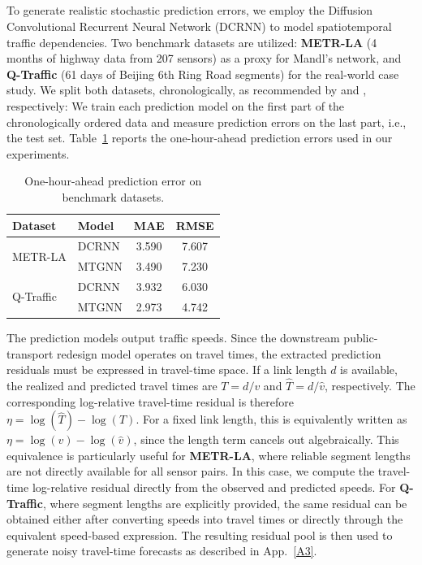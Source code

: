 \subsection{}\label{A2}

To generate realistic stochastic prediction errors, we employ the Diffusion Convolutional Recurrent Neural Network (DCRNN) \citep{li2017diffusion} to model spatiotemporal traffic dependencies. Two benchmark datasets are utilized: \textbf{METR-LA} (4 months of highway data from 207 sensors) as a proxy for Mandl’s network, and \textbf{Q-Traffic} (61 days of Beijing 6th Ring Road segments) for the real-world case study. We split both datasets, chronologically,  as recommended by \cite{li2017diffusion} and \cite{lu2022graph}, respectively: We train each prediction model on the first part of the chronologically ordered
data and measure prediction errors on the last part, i.e., the test set.
Table~\ref{tab:prediction_error} reports the one-hour-ahead prediction errors
used in our experiments.

\begin{table}[htbp!]
\centering
\caption{One-hour-ahead prediction error on benchmark datasets.}
\label{tab:prediction_error}
\begin{tabular}{llcc}
\hline
Dataset & Model & MAE & RMSE \\
\hline
\multirow{2}{*}{METR-LA}
& DCRNN & 3.590 & 7.607 \\
& MTGNN & 3.490 & 7.230 \\
\hline
\multirow{2}{*}{Q-Traffic}
& DCRNN & 3.932 & 6.030 \\
& MTGNN & 2.973 & 4.742 \\
\hline
\end{tabular}
\end{table}

The prediction models output traffic speeds. Since the downstream public-transport redesign model operates on travel times, the extracted prediction residuals must be expressed in travel-time space. If a link length $d$ is available, the realized and predicted travel times are $T=d/v$ and $\hat T=d/\hat v$, respectively. 
%
The corresponding log-relative travel-time residual is therefore $\eta=\log(\hat T)-\log(T)$. For a fixed link length, this is equivalently written as $\eta=\log(v)-\log(\hat v)$, since the length term cancels out algebraically.
%
This equivalence is particularly useful for \textbf{METR-LA}, where reliable segment lengths are not directly available for all sensor pairs. In this case, we compute the travel-time log-relative residual directly from the observed and predicted speeds. For \textbf{Q-Traffic}, where segment lengths are explicitly provided, the same residual can be obtained either after converting speeds into travel times or directly through the equivalent speed-based expression. The resulting residual pool is then used to generate noisy travel-time forecasts as described in App.~\ref{A3}.



